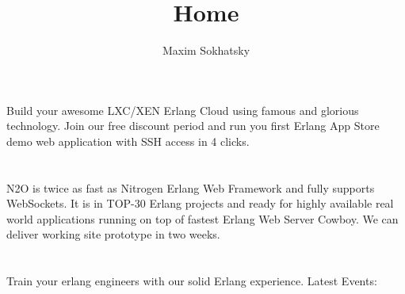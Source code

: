 \documentclass[11pt]{article}
\begin{document}
\title{Home}
\author{Maxim Sokhatsky}


\section*{}
\paragraph{}
Build your awesome LXC/XEN Erlang Cloud using famous  and glorious  technology.
Join our free discount period and run you first Erlang App Store demo web application with SSH access in 4 clicks.

\section*{}
\paragraph{}
N2O is twice as fast as Nitrogen Erlang Web Framework and fully supports WebSockets.
It is in TOP-30 Erlang projects and ready for highly available real world applications running on top of fastest Erlang Web Server Cowboy.
We can deliver working site prototype in two weeks.

\section*{}
\paragraph{}
Train your erlang engineers with our solid Erlang experience.
Latest Events:
\paragraph{}
\end{document}

